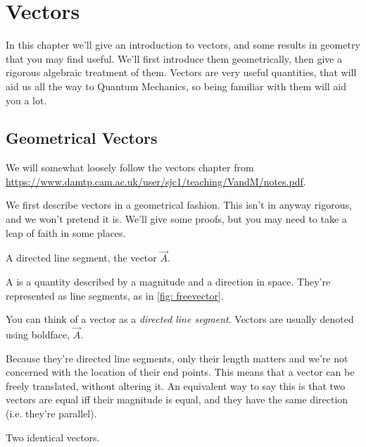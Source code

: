 \setlength{\chnumsep}{14em}
\chapter{Vectors}

\begin{overview}
In this chapter we'll give an introduction to vectors, and some results in
geometry that you may find useful. We'll first introduce them geometrically, then
give a rigorous algebraic treatment of them. Vectors are very useful quantities,
that will aid us all the way to Quantum Mechanics, so being familiar with them will aid you 
a lot. 
\end{overview}


\section{Geometrical Vectors}

We will somewhat loosely follow the vectors chapter from \url{https://www.damtp.cam.ac.uk/user/sjc1/teaching/VandM/notes.pdf}.


We first describe vectors in a geometrical fashion. This isn't in anyway rigorous, and we won't 
pretend it is. We'll give some proofs, but you may need to take a leap of faith in some places.

\begin{marginfigure}
\caption{A directed line segment, the vector \(\vec{A}\).}
\label{fig: freevector}
\vspace{4em}
\end{marginfigure}

\begin{definition}
  A  is a quantity described by a magnitude and a direction in space. They're
  represented as line segments, as in \cref{fig: freevector}.  
\end{definition}
You can think of a vector as a \emph{directed line segment}.
Vectors are usually denoted using boldface, \(\vec{A}\). 

Because they're directed line segments, only their length matters and
we’re not concerned with the location of their end points. This means that a
vector can be freely translated, without altering it. An equivalent way to say 
this is that two vectors are equal iff their magnitude is equal, and they have the
same direction (i.e. they're parallel).

\begin{marginfigure}
  \caption{Two identical vectors.}
  \end{marginfigure}

